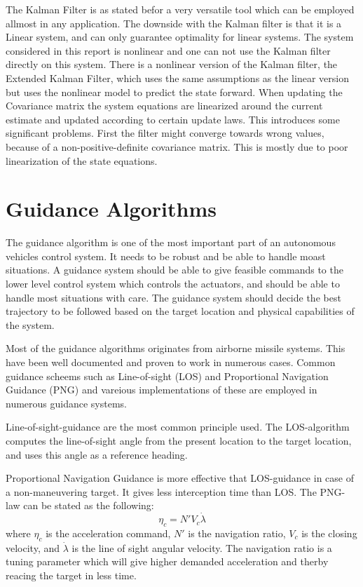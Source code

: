 	The Kalman Filter is as stated befor a very versatile tool which can be employed allmost in
	any application. The downside with the Kalman filter is that it is a Linear system, and can only
	guarantee optimality for linear systems. The system considered in this report is nonlinear and one can not
	use the Kalman filter directly on this system. There is a nonlinear version of the Kalman filter, the
	Extended Kalman Filter, which uses the same assumptions as the linear version but uses the nonlinear
	model to predict the state forward. When updating the Covariance matrix the system equations are
	linearized around the current estimate and updated according to certain update laws. This introduces some
	significant problems. First the filter might converge towards wrong values, because of a non-positive-definite
	covariance matrix. This is mostly due to poor linearization of the state equations. \cite{kalman}
	
\section{Guidance Algorithms}
        \label{chap1-guidance-alg}
        The guidance algorithm is one of the most important part of an autonomous vehicles control system. It
	needs to be robust and be able to handle moast situations. A guidance system should be able to give
	feasible commands to the lower level control system which controls the actuators, and should be able
	to handle most situations with care. The guidance system should decide the best trajectory to be
	followed based on the target location and physical capabilities of the system.\cite{GuidanceReview}

	Most of the guidance algorithms originates from airborne missile systems. This have been well
	documented and proven to work in numerous cases. Common guidance scheems such as Line-of-sight (LOS)
	and Proportional Navigation Guidance (PNG) and vareious implementations of these are employed in
	numerous guidance systems.

        Line-of-sight-guidance are the most common principle used. The LOS-algorithm computes the
	line-of-sight angle from the present location to the target location, and uses this angle as a
	reference heading.

        Proportional Navigation Guidance is more effective that LOS-guidance in case of a non-maneuvering
	target. It gives less interception time than LOS. The PNG-law can be stated as the following:
	\cite{GuidanceReview}
        \begin{equation}
                \eta_c = N' V_c \dot{\lambda}
        \end{equation}
        where $\eta_c$ is the acceleration command, $N'$ is the navigation ratio, $V_c$ is the closing
	velocity, and $\dot{\lambda}$ is the line of sight angular velocity. The navigation ratio is a tuning
	parameter which will give higher demanded acceleration and therby reacing the target in less time.

